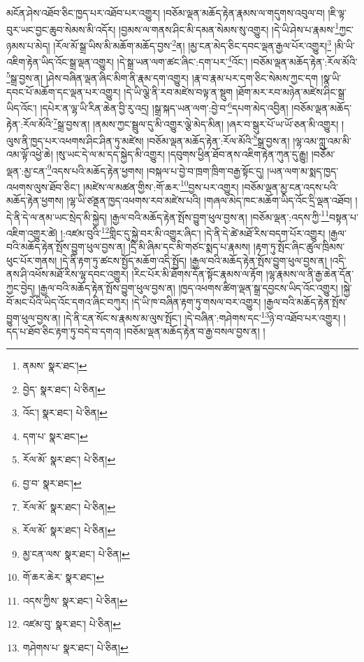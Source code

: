 མངོན་ཤེས་འཐོབ་ཅིང་ཁྱད་པར་འཐོབ་པར་འགྱུར། །བཅོམ་ལྡན་མཆོད་རྟེན་རྣམས་ལ་གདུགས་འབུལ་བ། །ཇི་ལྟ་བུར་ཡང་བྱང་ཆུབ་སེམས་མི་འདོར། །བྱམས་ལ་གནས་ཤིང་མི་དམན་སེམས་སུ་འགྱུར། །དེ་ཡི་ཤེས་པ་རྣམས་\footnote{ནམས་  སྣར་ཐང་། }ཀྱང་ཉམས་པ་མེད། །རོལ་མོ་སྒྲ་ཡིས་མི་མཆོག་མཆོད་བྱས་\footnote{བྱེད་  སྣར་ཐང་།  པེ་ཅིན། }ན། །མྱ་ངན་མེད་ཅིང་དབང་ལྡན་རྒྱལ་པོར་འགྱུར།\footnote{འོང་།  སྣར་ཐང་།  པེ་ཅིན། } །མི་ཡི་འཇིག་རྟེན་ཡིད་འོང་སྒྲ་ལྡན་འགྱུར། །དེ་སྒྲ་ཡན་ལག་ཚང་ཞིང་:དག་པར་\footnote{དག་པ་  སྣར་ཐང་། }འོང་། །བཅོམ་ལྡན་མཆོད་རྟེན་:རོལ་མོའི་\footnote{རོལ་མོ་  སྣར་ཐང་།  པེ་ཅིན། }སྒྲ་བྱས་ན། །ཤེས་བཞིན་ལྡན་ཞིང་མིག་ནི་རྣམ་དག་འགྱུར། །རྣ་བ་རྣམ་པར་དག་ཅིང་སེམས་ཀྱང་དག །སྣ་ཡི་དབང་པོ་མཆོག་དང་ལྡན་པར་འགྱུར། །དེ་ཡི་ལྕེ་ནི་རབ་མཛེས་བལྟ་ན་སྡུག །ཐོག་མར་རབ་མཉེན་མཛེས་ཤིང་སྒྲ་ཡིད་འོང་། །དཔེར་ན་ལྷ་ཡི་རིན་ཆེན་བྱི་རུ་འདྲ། །སྒྲ་སྐད་ཡན་ལག་:བྱེ་བ་\footnote{བྱ་བ་  སྣར་ཐང་། }དཔག་མེད་འབྱིན། །བཅོམ་ལྡན་མཆོད་རྟེན་:རོལ་མོའི་\footnote{རོལ་མོ་  སྣར་ཐང་།  པེ་ཅིན། }སྒྲ་བྱས་ན། །ནམས་ཀྱང་སྦྲུལ་དུ་མི་འགྱུར་ལྕེ་མེད་མིན། །ཞར་བ་སྒུར་པོ་ཡ་ཡོ་ཅན་མི་འགྱུར། །ལུས་ནི་ཁྱད་པར་འཕགས་ཤིང་ཤིན་ཏུ་མཛེས། །བཅོམ་ལྡན་མཆོད་རྟེན་:རོལ་མོའི་\footnote{རོལ་མོ་  སྣར་ཐང་།  པེ་ཅིན། }སྒྲ་བྱས་ན། །ལྷ་འམ་ཀླུ་འམ་མི་འམ་ལྟོ་འཕྱེ་ཆེ། །སུ་ཡང་དེ་ལ་མ་དད་སྐྱེད་མི་འགྱུར། །དབུགས་ཕྱིན་ཐོབ་ནས་འཇིག་རྟེན་ཀུན་དུ་རྒྱུ། །བཅོམ་ལྡན་:མྱ་ངན་\footnote{མྱ་ངན་ལས་  སྣར་ཐང་།  པེ་ཅིན། }འདས་པའི་མཆོད་རྟེན་ཕྱགས། །བསྐལ་པ་བྱེ་བ་ཁྲག་ཁྲིག་བརྒྱ་སྟོང་དུ། །ཡན་ལག་མ་སྨད་ཁྱད་འཕགས་ལུས་ཐོབ་ཅིང་། །མཛེས་ལ་མཚན་གྱིས་:གོ་ཆར་\footnote{གོ་ཆར་ཆེར་  སྣར་ཐང་། }བྱས་པར་འགྱུར། །བཅོམ་ལྡན་མྱ་ངན་འདས་པའི་མཆོད་རྟེན་ཕྱགས། །ལྷ་ཡི་ཙནྡན་ཁྱད་འཕགས་རབ་མཛེས་པའི། །གཞལ་མེད་ཁང་མཆོག་ཡིད་འོང་དྲི་ལྡན་འཐོབ། །དེ་ནི་དེ་ལ་ནམ་ཡང་སྲེད་མི་སྐྱེད། །རྒྱལ་བའི་མཆོད་རྟེན་སྤོས་བྱུག་ཕུལ་བྱས་ན། །བཅོམ་ལྡན་:འདས་ཀྱི་\footnote{འདས་ཀྱིས་  སྣར་ཐང་།  པེ་ཅིན། }བསྟན་པ་འཇིག་འགྱུར་ཚེ། །:འཛམ་བུའི་\footnote{འཛམ་བུ་  སྣར་ཐང་།  པེ་ཅིན། }གླིང་དུ་སྐྱེ་བར་མི་འགྱུར་ཞིང་། །དེ་ནི་དེ་ཚེ་མཐོ་རིས་བདག་པོར་འགྱུར། །རྒྱལ་བའི་མཆོད་རྟེན་སྤོས་བྱུག་ཕུལ་བྱས་ན། །དྲི་མི་ཞིམ་དང་མི་གཙང་སྨད་པ་རྣམས། །རྟག་ཏུ་སྤོང་ཞིང་ཚུལ་ཁྲིམས་ཕུང་པོར་གནས། །དེ་ནི་རྟག་ཏུ་ཚངས་སྤྱོད་མཆོག་འདི་སྤྱོད། །རྒྱལ་བའི་མཆོད་རྟེན་སྤོས་བྱུག་ཕུལ་བྱས་ན། །འདི་ནས་ཤི་འཕོས་མཐོ་རིས་ལྷ་དབང་འགྱུར། །རིང་པོར་མི་ཐོགས་དོན་སྟོང་རྣམས་ལ་རྟོག །ལྷ་རྣམས་ལ་ནི་རྒྱ་ཆེན་དོན་ཀྱང་བྱེད། །རྒྱལ་བའི་མཆོད་རྟེན་སྤོས་བྱུག་ཕུལ་བྱས་ན། །ཁྱད་འཕགས་ཚིག་ལྡན་སྒྲ་དབྱངས་ཡིད་འོང་འགྱུར། །སྐྱེ་བོ་མང་པོའི་ཡིད་འོང་དགའ་ཞིང་བཀུར། །དེ་ཡི་ཁ་བཞིན་རྟག་ཏུ་གསལ་བར་འགྱུར། །རྒྱལ་བའི་མཆོད་རྟེན་སྤོས་བྱུག་ཕུལ་བྱས་ན། །དེ་ནི་ངན་སོང་ས་རྣམས་མ་ལུས་སྤོང་། །དེ་བཞིན་:གཤེགས་དང་\footnote{གཤེགས་པ་  སྣར་ཐང་།  པེ་ཅིན། }ཉེ་བ་འཐོབ་པར་འགྱུར། །དད་པ་ཐོབ་ཅིང་རྟག་ཏུ་བདེ་བ་དགའ། །བཅོམ་ལྡན་མཆོད་རྟེན་བ་རྒྱ་བསལ་བྱས་ན། །
